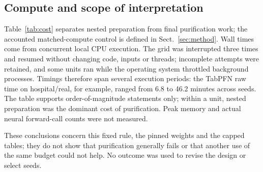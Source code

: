 \subsection{Compute and scope of interpretation}
Table~\ref{tab:cost} separates nested preparation from final purification work;
the accounted matched-compute control is defined in Sect.~\ref{sec:method}. Wall times come from
concurrent local CPU execution. The grid was interrupted three times and
resumed without changing code, inputs or threads; incomplete attempts were retained,
and some units ran while the operating system throttled background processes.
Timings therefore span several execution periods: the TabPFN raw time on hospital/real, for example, ranged from 6.8 to 46.2
minutes across seeds. The table supports order-of-magnitude statements only;
within a unit, nested preparation was the dominant cost of purification.
Peak memory and actual neural forward-call counts were not measured.


These conclusions concern this fixed rule, the pinned weights and the capped tables;
they do not show that purification generally fails or that another use of the same
budget could not help. No outcome was used to revise the design or select seeds.
